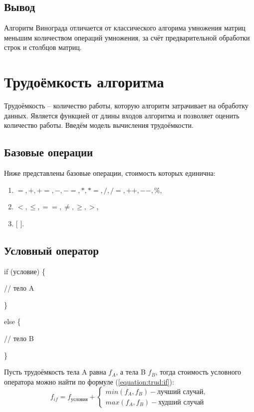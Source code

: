         \subsection{Вывод}
            Алгоритм Винограда отличается от классического алгорима умножения матриц меньшим количеством операций умножения, 
            за счёт предварительной обработки строк и столбцов матриц. 

    \section{Трудоёмкость алгоритма}
        Трудоёмкость -- количество работы, которую алгоритм затрачивает на обработку данных.
        Является функцией от длины входов алгоритма и позволяет оценить количество работы.
        Введём модель вычисления трудоёмкости.

        \subsection{Базовые операции}
            Ниже представлены базовые операции, стоимость которых единична:
            \begin{enumerate}
                \item $ =, +, +=, -, -=, *, *=,  /, /=, ++, --, \% $,
                \item $ <, \leqslant, ==, \neq, \geqslant , > $,
                \item $ [ $  $ ] $.
            \end{enumerate}
            
        \subsection{Условный оператор}
            if (условие) \{

                // тело A

            \}

            else \{

                // тело B
            
            \}

            Пусть трудоёмкость тела A равна $ f_A $, а тела B $ f_B $, тогда
            стоимость условного оператора можно найти по формуле (\ref{equation:trud:if}):
            \begin{equation}
                f_{if} = f_\text{условия} + \left\{
                    \begin{matrix}
                    min(f_A, f_B) - \text{лучший случай},\\
                    max(f_A, f_B) - \text{худший случай} 
                    \end{matrix}\right.
                \label{equation:trud:if}
            \end{equation}

